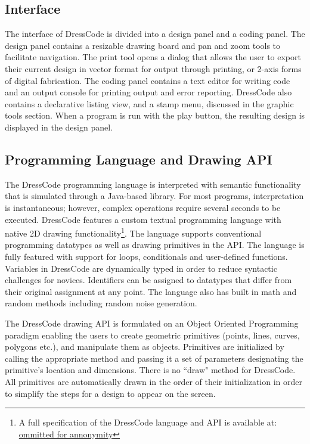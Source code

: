 \documentclass{sigchi}
\begin{document}
\subsection{Interface}
The interface of DressCode is divided into a design panel and a coding panel. The design panel contains a resizable drawing board and pan and zoom tools to facilitate navigation. The print tool opens a dialog that allows the user to export their current design in vector format for output through printing, or 2-axis forms of digital fabrication. The coding panel contains a text editor for writing code and an output console for printing output and error reporting. DressCode also contains a declarative listing view, and a stamp menu, discussed in the graphic tools section. When a program is run with the play button, the resulting design is displayed in the design panel.

\subsection{Programming Language and Drawing API}
The DressCode programming language is interpreted with semantic functionality that is simulated through a Java-based library. For most programs, interpretation is instantaneous; however, complex operations require several seconds to be executed. DressCode features a custom textual programming language with native 2D drawing functionality\footnote{A full specification of the DressCode language and API is available at: \url{ommitted for annonymity}}. The language supports conventional programming datatypes as well as drawing primitives in the API. The language is fully featured with support for loops, conditionals and user-defined functions. Variables in DressCode are dynamically typed in order to reduce syntactic challenges for novices. Identifiers can be assigned to datatypes that differ from their original assignment at any point. The language also has built in math and random methods including random noise generation.

The DressCode drawing API is formulated on an Object Oriented Programming paradigm enabling the users to create geometric primitives (points, lines, curves, polygons etc.), and manipulate them as objects. Primitives are initialized by calling the appropriate method and passing it a set of parameters designating the primitive's location and dimensions. There is no ``draw" method for DressCode. All primitives are automatically drawn in the order of their initialization in order to simplify the steps for a design to appear on the screen.
 
\end{document}
